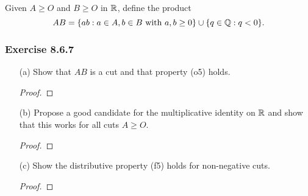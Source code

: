Given \( A \geq O  \) and \( B \geq O  \) in \( \mathbb{R}  \), define the product 
\[  AB = \{ ab: a \in A , b \in B \ \text{with} \ a,b \geq 0  \} \cup \{ q \in \mathbb{Q} : q < 0  \}. \]

\subsubsection{Exercise 8.6.7} 
\begin{enumerate}
    \item[(a)] Show that \( AB  \) is a cut and that property (o5) holds.
        \begin{proof}
        
        \end{proof}
    \item[(b)] Propose a good candidate for the multiplicative identity on \( \mathbb{R}  \) and show that this works for all cuts \( A \geq O  \).
        \begin{proof}
        
        \end{proof}
    \item[(c)] Show the distributive property (f5) holds for non-negative cuts.
        \begin{proof}
        
        \end{proof}
\end{enumerate}

